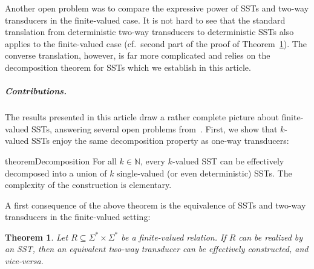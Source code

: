\documentclass{article}
\newtheorem{theorem}{Theorem}\newtheorem{lemma}[theorem]{Lemma}\newtheorem{proposition}[theorem]{Proposition}\newtheorem{corollary}[theorem]{Corollary}\newtheorem{definition}[theorem]{Definition}\newtheorem{claim}[theorem]{Claim}\newtheorem{remark}[theorem]{Remark}\newtheorem{example}[theorem]{Example}\newtheorem*{claim*}{Claim}
\newcommand{\RestateRemark}[1]{{\normalfont\bfseries #1}}
\newcommand{\RestateInit}[1]{\newcommand{#1}{}}
\newcommand{\alp}{\Sigma}
\begin{document}
Another open problem was to compare the expressive power of SSTs and 
two-way transducers in the finite-valued case.
It is  not hard to see that the standard translation from deterministic
two-way transducers to deterministic SSTs also applies to the
finite-valued case (cf.~second part of the proof of Theorem~\ref{thm:finval-SST-2FT}).
The converse translation, however, is far more complicated and relies on
the decomposition theorem for SSTs which we establish in this article.



\medskip
\subparagraph*{\bf Contributions.} 
The results presented in this article  draw a
rather complete picture about 
finite-valued SSTs, answering several open problems from~\cite{DBLP:conf/icalp/AlurD11}.
First, we show that $k$-valued SSTs enjoy the same decomposition property as
one-way transducers:  
\RestateInit{\restateDecomposition}

\begin{restatable}{theorem}{Decomposition}
\label{thm:FiniteValuedToDecomposition}\RestateRemark{\restateDecomposition}
    For all $k \in \mathbb{N}$, 
    every $k$-valued SST can be effectively decomposed into a union of
    $k$ single-valued (or even deterministic) SSTs.
    The complexity of the construction is elementary.
\end{restatable}


A first consequence of the above theorem is the equivalence of
SSTs and two-way transducers in the finite-valued setting:


    
\begin{theorem}\label{thm:finval-SST-2FT}
  Let $R\subseteq \alp^*\times \alp^*$ be a finite-valued relation.
  If $R$ can be realized by an SST, then an equivalent 
  two-way transducer can be effectively constructed, and vice-versa.
\end{theorem}
\end{document}
